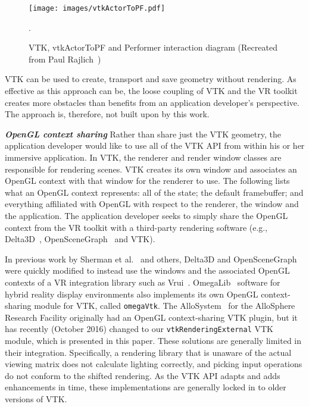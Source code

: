 \begin{figure}[h!]
  \centering
  \texttt{[image: images/vtkActorToPF.pdf]}
  \caption{VTK, vtkActorToPF and Performer interaction diagram (Recreated from Paul Rajlich~\cite{Leigh98limbo/vtk})}.
  \label{fig:vtkActorToPF}
\end{figure}

VTK can be used to create, transport and save geometry without rendering. As effective as this approach can be, the loose coupling of VTK and the VR toolkit creates more obstacles than benefits from an application developer's perspective. The approach is, therefore, not built upon by this work.

\textbf{\textit{OpenGL context sharing}} Rather than share just the VTK geometry, the application developer would like to use all of the VTK API from within his or her immersive application.
In VTK, the renderer and render window classes are responsible for rendering scenes.
VTK creates its own window and associates an OpenGL context with that window for the renderer to use.
The following lists what an OpenGL context represents: all of the state; the default framebuffer; and everything affiliated with OpenGL with respect to the renderer, the window and the application.
The application developer seeks to simply share the OpenGL context from the VR toolkit with a third-party rendering software (e.g., Delta3D~\cite{McDowell:2006}, OpenSceneGraph~\cite{Wang:2010} and VTK). 

In previous work by Sherman et al.~\cite{Sherman:2010} and others, Delta3D
and OpenSceneGraph were quickly modified to instead use the windows and the associated
OpenGL contexts of a VR integration library such as Vrui~\cite{Kreylos:2006}.  
OmegaLib~\cite{Febretti:2014} software for hybrid reality display environments also implements its own OpenGL context-sharing module for VTK, called \texttt{omegaVtk}. The AlloSystem~\cite{Amatriain:2009} for the AlloSphere Research Facility originally had an OpenGL context-sharing VTK plugin, but it has recently (October 2016) changed to our \texttt{vtkRenderingExternal} VTK module, which is presented in this paper.
These solutions are generally limited in their integration.
Specifically, a rendering library that is unaware of the actual
viewing matrix does not calculate lighting correctly, and
picking input operations do not conform to the shifted rendering. As the VTK API adapts and adds enhancements in time, these implementations are generally locked in to older versions of VTK.

